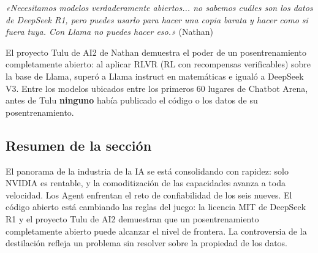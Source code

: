 \textit{«Necesitamos modelos verdaderamente abiertos... no sabemos cuáles son los datos de DeepSeek R1, pero puedes usarlo para hacer una copia barata y hacer como si fuera tuya. Con Llama no puedes hacer eso.»} (Nathan)

El proyecto Tulu de AI2 de Nathan demuestra el poder de un posentrenamiento completamente abierto: al aplicar RLVR (RL con recompensas verificables) sobre la base de Llama, superó a Llama instruct en matemáticas e igualó a DeepSeek V3. Entre los modelos ubicados entre los primeros 60 lugares de Chatbot Arena, antes de Tulu \textbf{ninguno} había publicado el código o los datos de su posentrenamiento.

\subsection{Resumen de la sección}

El panorama de la industria de la IA se está consolidando con rapidez: solo NVIDIA es rentable, y la comoditización de las capacidades avanza a toda velocidad. Los Agent enfrentan el reto de confiabilidad de los seis nueves. El código abierto está cambiando las reglas del juego: la licencia MIT de DeepSeek R1 y el proyecto Tulu de AI2 demuestran que un posentrenamiento completamente abierto puede alcanzar el nivel de frontera. La controversia de la destilación refleja un problema sin resolver sobre la propiedad de los datos.
